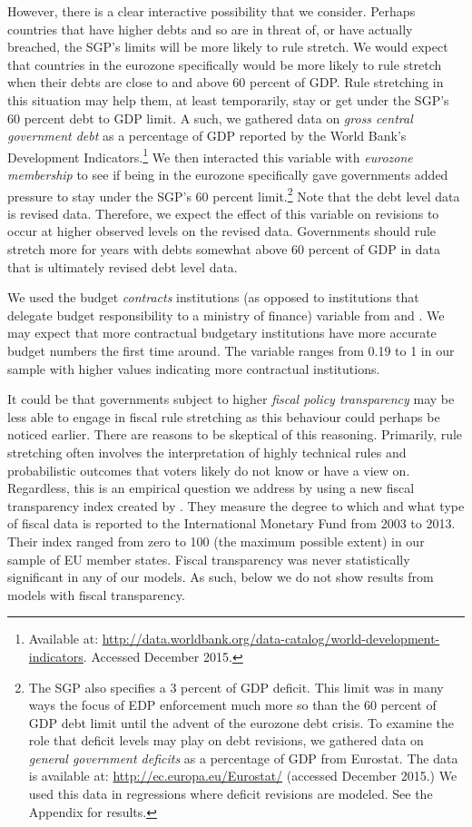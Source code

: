 \documentclass[]{article}
\begin{document}
However, there is a clear interactive possibility that we consider. Perhaps countries that have higher debts and so are in threat of, or have actually breached, the SGP's limits will be more likely to rule stretch. We would expect that countries in the eurozone specifically would be more likely to rule stretch when their debts are close to and above 60 percent of GDP. Rule stretching in this situation may help them, at least temporarily, stay or get under the SGP's 60 percent debt to GDP limit. A such, we gathered data on \emph{gross central government debt} as a percentage of GDP reported by the World Bank's Development Indicators.\footnote{Available at: \url{http://data.worldbank.org/data-catalog/world-development-indicators}. Accessed December 2015.} We then interacted this variable with \emph{eurozone membership} to see if being in the eurozone specifically gave governments added pressure to stay under the SGP's 60 percent limit.\footnote{The SGP also specifies a 3 percent of GDP deficit. This limit was in many ways the focus of EDP enforcement much more so than the 60 percent of GDP debt limit until the advent of the eurozone debt crisis. To examine the role that deficit levels may play on debt revisions, we gathered data on \emph{general government deficits} as a percentage of GDP from Eurostat. The data is available at: \url{http://ec.europa.eu/Eurostat/} (accessed December 2015.) We used this data in regressions where deficit revisions are modeled. See the Appendix for results.} Note that the debt level data is revised data. Therefore, we expect the effect of this variable on revisions to occur at higher observed levels on the revised data. Governments should rule stretch more for years with debts somewhat above 60 percent of GDP in data that is ultimately revised debt level data.

We used the budget \emph{contracts} institutions (as opposed to institutions that delegate budget responsibility to a ministry of finance) variable from \cite{hallerberg2007design} and \cite{hallerbergstrauch2009}. We may expect that more contractual budgetary institutions have more accurate budget numbers the first time around. The variable ranges from 0.19 to 1 in our sample with higher values indicating more contractual institutions. 

It could be that governments subject to higher \emph{fiscal policy transparency} may be less able to engage in fiscal rule stretching as this behaviour could perhaps be noticed earlier. There are reasons to be skeptical of this reasoning. Primarily, rule stretching often involves the interpretation of highly technical rules and probabilistic outcomes that voters likely do not know or have a view on. Regardless, this is an empirical question we address by using a new fiscal transparency index created by \cite{Wang2015}. They measure the degree to which and what type of fiscal data is reported to the International Monetary Fund from 2003 to 2013. Their index ranged from zero to 100 (the maximum possible extent) in our sample of EU member states. Fiscal transparency was never statistically significant in any of our models. As such, below we do not show results from models with fiscal transparency.
\end{document}
